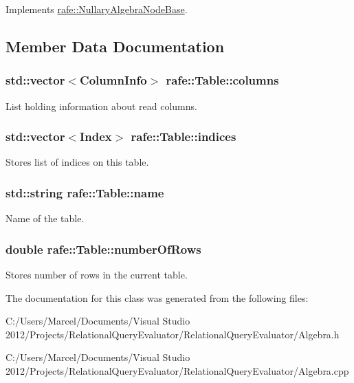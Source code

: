 Implements \hyperlink{classrafe_1_1_nullary_algebra_node_base_a4e1bc16e76d9e41a8fb575008d8f15e5}{rafe\+::\+Nullary\+Algebra\+Node\+Base}.



\subsection{Member Data Documentation}
\hypertarget{classrafe_1_1_table_af3a4fb3f52ae24f09a1073c27bd79a6a}{
\subsubsection[{columns}]{\setlength{\rightskip}{0pt plus 5cm}std\+::vector$<${\bf Column\+Info}$>$ rafe\+::\+Table\+::columns}}\label{classrafe_1_1_table_af3a4fb3f52ae24f09a1073c27bd79a6a}
List holding information about read columns. \hypertarget{classrafe_1_1_table_aaad0b0fba6c76335a428b7e38df992b4}{
\subsubsection[{indices}]{\setlength{\rightskip}{0pt plus 5cm}std\+::vector$<${\bf Index}$>$ rafe\+::\+Table\+::indices}}\label{classrafe_1_1_table_aaad0b0fba6c76335a428b7e38df992b4}
Stores list of indices on this table. \hypertarget{classrafe_1_1_table_a398b089bc1b42a3ca61c21ebda706cc4}{
\subsubsection[{name}]{\setlength{\rightskip}{0pt plus 5cm}std\+::string rafe\+::\+Table\+::name}}\label{classrafe_1_1_table_a398b089bc1b42a3ca61c21ebda706cc4}
Name of the table. \hypertarget{classrafe_1_1_table_aa9c9eecf04e1203cc1f6ac25ecbd2baa}{
\subsubsection[{number\+Of\+Rows}]{\setlength{\rightskip}{0pt plus 5cm}double rafe\+::\+Table\+::number\+Of\+Rows}}\label{classrafe_1_1_table_aa9c9eecf04e1203cc1f6ac25ecbd2baa}
Stores number of rows in the current table. 

The documentation for this class was generated from the following files\+:\begin{DoxyCompactItemize}
\item 
C\+:/\+Users/\+Marcel/\+Documents/\+Visual Studio 2012/\+Projects/\+Relational\+Query\+Evaluator/\+Relational\+Query\+Evaluator/Algebra.\+h\item 
C\+:/\+Users/\+Marcel/\+Documents/\+Visual Studio 2012/\+Projects/\+Relational\+Query\+Evaluator/\+Relational\+Query\+Evaluator/Algebra.\+cpp\end{DoxyCompactItemize}
